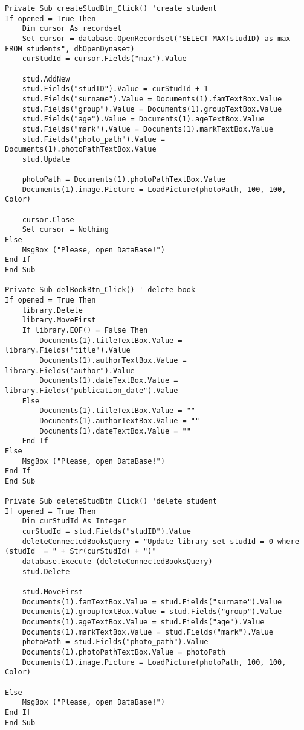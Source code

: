 \begin{lstlisting}[caption=VBA code]
Private Sub createStudBtn_Click() 'create student
If opened = True Then
    Dim cursor As recordset
    Set cursor = database.OpenRecordset("SELECT MAX(studID) as max FROM students", dbOpenDynaset)
    curStudId = cursor.Fields("max").Value
    
    stud.AddNew
    stud.Fields("studID").Value = curStudId + 1
    stud.Fields("surname").Value = Documents(1).famTextBox.Value
    stud.Fields("group").Value = Documents(1).groupTextBox.Value
    stud.Fields("age").Value = Documents(1).ageTextBox.Value
    stud.Fields("mark").Value = Documents(1).markTextBox.Value
    stud.Fields("photo_path").Value = Documents(1).photoPathTextBox.Value
    stud.Update
    
    photoPath = Documents(1).photoPathTextBox.Value
    Documents(1).image.Picture = LoadPicture(photoPath, 100, 100, Color)
    
    cursor.Close
    Set cursor = Nothing
Else
    MsgBox ("Please, open DataBase!")
End If
End Sub

Private Sub delBookBtn_Click() ' delete book
If opened = True Then
    library.Delete
    library.MoveFirst
    If library.EOF() = False Then
        Documents(1).titleTextBox.Value = library.Fields("title").Value
        Documents(1).authorTextBox.Value = library.Fields("author").Value
        Documents(1).dateTextBox.Value = library.Fields("publication_date").Value
    Else
        Documents(1).titleTextBox.Value = ""
        Documents(1).authorTextBox.Value = ""
        Documents(1).dateTextBox.Value = ""
    End If
Else
    MsgBox ("Please, open DataBase!")
End If
End Sub

Private Sub deleteStudBtn_Click() 'delete student
If opened = True Then
    Dim curStudId As Integer
    curStudId = stud.Fields("studID").Value
    deleteConnectedBooksQuery = "Update library set studId = 0 where (studId  = " + Str(curStudId) + ")"
    database.Execute (deleteConnectedBooksQuery)
    stud.Delete

    stud.MoveFirst
    Documents(1).famTextBox.Value = stud.Fields("surname").Value
    Documents(1).groupTextBox.Value = stud.Fields("group").Value
    Documents(1).ageTextBox.Value = stud.Fields("age").Value
    Documents(1).markTextBox.Value = stud.Fields("mark").Value
    photoPath = stud.Fields("photo_path").Value
    Documents(1).photoPathTextBox.Value = photoPath
    Documents(1).image.Picture = LoadPicture(photoPath, 100, 100, Color)
    
Else
    MsgBox ("Please, open DataBase!")
End If
End Sub


\end{lstlisting}
